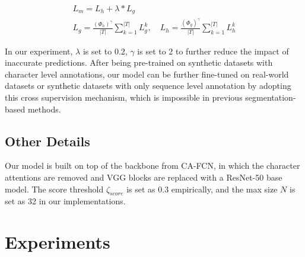 \documentclass[letterpaper]{article} \usepackage{aaai20}  \usepackage{times}  \usepackage{helvet} \usepackage{courier}  \usepackage[hyphens]{url}  \usepackage{graphicx} \urlstyle{rm} \def\UrlFont{\rm}  \usepackage{graphicx}  \frenchspacing  \setlength{\pdfpagewidth}{8.5in}  \setlength{\pdfpageheight}{11in}
\begin{document}
\begin{equation}
\begin{gathered}
 L_{m} = L_{h} + \lambda*L_{g} \\
 L_{g} = \frac{(\Phi_{h})^\gamma}{|T|}\sum_{k=1}^{|T|}L_{g}^{k}, \quad
 L_{h} = \frac{(\Phi_{g})^\gamma}{|T|}\sum_{k=1}^{|T|}L_{h}^{k} 
\end{gathered}
\end{equation}

 In our experiment, $\lambda$ is set to 0.2, $\gamma$ is set to 2 to further reduce the impact of inaccurate predictions. After being pre-trained on synthetic datasets with character level annotations, our model can be further fine-tuned on real-world datasets or synthetic datasets with only sequence level annotation by adopting this cross supervision mechanism, which is impossible in previous segmentation-based methods. 
 
\subsection{Other Details}

Our model is built on top of the backbone from CA-FCN, in which the character attentions are removed and VGG blocks are replaced with a ResNet-50\cite{resnet} base model. The score threshold $\zeta_{score}$ is set as 0.3 empirically, and the max size $N$ is set as 32 in our implementations.


\section{Experiments}
\end{document}
